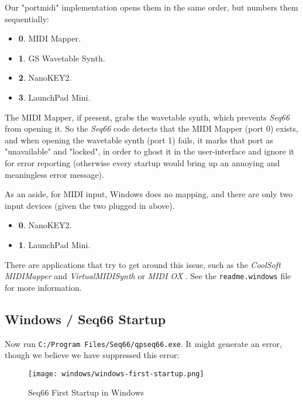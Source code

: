    Our "portmidi" implementation opens them in the same order, but
   numbers them sequentially:

   \begin{itemize}
      \item \textbf{0}. MIDI Mapper.
      \item \textbf{1}. GS Wavetable Synth.
      \item \textbf{2}. NanoKEY2.
      \item \textbf{3}. LaunchPad Mini.
   \end{itemize}

   The MIDI Mapper, if present, grabs the wavetable synth, which prevents
   \textsl{Seq66} from opening it.
   So the \textsl{Seq66}
   code detects that the MIDI Mapper (port 0) exists, and when opening
   the wavetable synth (port 1) fails, it marks that port as
   "unavailable" and "locked", in order to ghost it in the user-interface
   and ignore it for error reporting (otherwise every startup would bring
   up an annoying and meaningless error message).

   As an aside, for MIDI input, Windows does no mapping, and there are
   only two input devices (given the two plugged in above).

   \begin{itemize}
      \item \textbf{0}. NanoKEY2.
      \item \textbf{1}. LaunchPad Mini.
   \end{itemize}

   There are applications that try to get around this issue, such as
   the \textsl{CoolSoft MIDIMapper} and \textsl{VirtualMIDISynth}
   \cite{midimapper} or \textsl{MIDI OX} \cite{midiox}.
   See the \texttt{readme.windows} file for more information.

\subsection{Windows / Seq66 Startup}
\label{subsec:windows_seq66_startup}

   Now run \texttt{C:/Program Files/Seq66/qpseq66.exe}.
   It might generate an error, though we believe we have suppressed
   this error:

\begin{figure}[H]
   \centering 
   \texttt{[image: windows/windows-first-startup.png]}
   \caption{Seq66 First Startup in Windows}
   \label{fig:windows_first_startup}
\end{figure}

